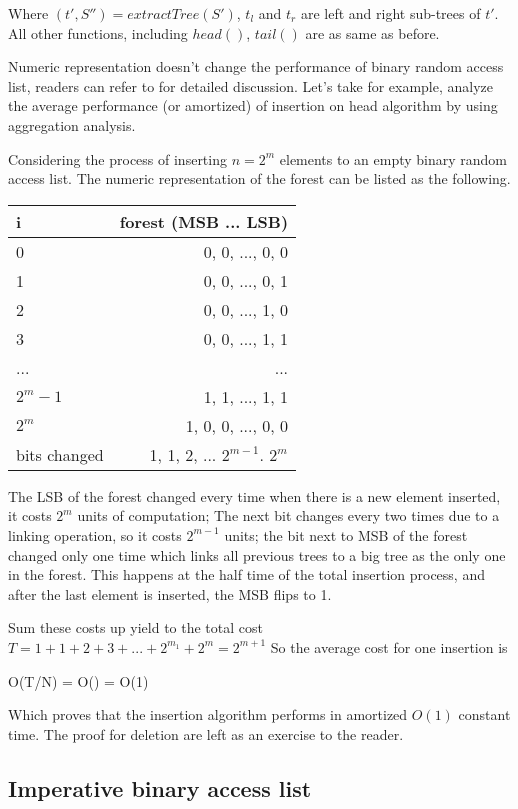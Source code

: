 \documentclass[UTF8]{article}
\begin{document}
Where $(t', S'') = extractTree(S')$, $t_l$ and $t_r$ are left and right
sub-trees of $t'$. All other functions, including $head()$, $tail()$ are
as same as before.

Numeric representation doesn't change the performance of binary random
access list, readers can refer to \cite{okasaki-ralist} for detailed
discussion. Let's take for example, analyze the average performance (or amortized) of insertion
on head algorithm by using aggregation analysis.

Considering the process of inserting $n = 2^m$ elements to an empty binary random access list.
The numeric representation of the forest can be listed as the following.

\begin{tabular}{l | r}
  \hline
  i & forest (MSB ... LSB) \\
  \hline
  0 & 0, 0, ..., 0, 0 \\
  1 & 0, 0, ..., 0, 1 \\
  2 & 0, 0, ..., 1, 0 \\
  3 & 0, 0, ..., 1, 1 \\
  ... & ... \\
  $2^m-1$ & 1, 1, ..., 1, 1 \\
  $2^m$ & 1, 0, 0, ..., 0, 0 \\
  \hline
  bits changed & 1, 1, 2, ... $2^{m-1}$. $2^m$ \\
  \hline
\end{tabular}

The LSB of the forest changed every time when there is a new element inserted,
it costs $2^m$ units of computation; The next bit changes every two times due
to a linking operation, so it costs $2^{m-1}$ units; the bit next to MSB of
the forest changed only one time which links all previous trees to a big tree
as the only one in the forest. This happens at the half time of the total
insertion process, and after the last element is inserted, the MSB flips to 1.

Sum these costs up yield to the total cost $T = 1 + 1 + 2 + 3 + ... + 2^{m_1} + 2^m = 2^{m+1}$
So the average cost for one insertion is

\be
O(T/N) = O() = O(1)
\ee

Which proves that the insertion algorithm performs in amortized $O(1)$ constant time.
The proof for deletion are left as an exercise to the reader.

\subsection{Imperative binary access list}
\end{document}
